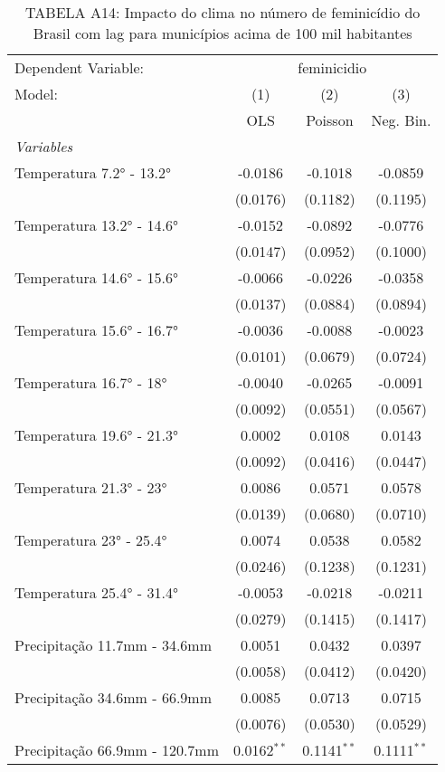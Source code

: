 \documentclass[
]{article}
\begin{document}
\begin{table}[htbp]
\centering
\caption{TABELA A14: Impacto do clima no número de feminicídio do Brasil com lag para municípios acima de 100 mil habitantes}
\begin{tabular}{lccc}
\tabularnewline\midrule\midrule
Dependent Variable:&\multicolumn{3}{c}{feminicidio}\\
Model:&(1) & (2) & (3)\\
 &  OLS & Poisson & Neg. Bin.\\
\midrule \emph{Variables}&   &   &  \\
Temperatura 7.2° - 13.2° & -0.0186 & -0.1018 & -0.0859\\
  &(0.0176) & (0.1182) & (0.1195)\\
Temperatura 13.2° - 14.6° & -0.0152 & -0.0892 & -0.0776\\
  &(0.0147) & (0.0952) & (0.1000)\\
Temperatura 14.6° - 15.6° & -0.0066 & -0.0226 & -0.0358\\
  &(0.0137) & (0.0884) & (0.0894)\\
Temperatura 15.6° - 16.7° & -0.0036 & -0.0088 & -0.0023\\
  &(0.0101) & (0.0679) & (0.0724)\\
Temperatura 16.7° - 18° & -0.0040 & -0.0265 & -0.0091\\
  &(0.0092) & (0.0551) & (0.0567)\\
Temperatura 19.6° - 21.3° & 0.0002 & 0.0108 & 0.0143\\
  &(0.0092) & (0.0416) & (0.0447)\\
Temperatura 21.3° - 23° & 0.0086 & 0.0571 & 0.0578\\
  &(0.0139) & (0.0680) & (0.0710)\\
Temperatura 23° - 25.4° & 0.0074 & 0.0538 & 0.0582\\
  &(0.0246) & (0.1238) & (0.1231)\\
Temperatura 25.4° - 31.4° & -0.0053 & -0.0218 & -0.0211\\
  &(0.0279) & (0.1415) & (0.1417)\\
Precipitação 11.7mm - 34.6mm & 0.0051 & 0.0432 & 0.0397\\
  &(0.0058) & (0.0412) & (0.0420)\\
Precipitação 34.6mm - 66.9mm & 0.0085 & 0.0713 & 0.0715\\
  &(0.0076) & (0.0530) & (0.0529)\\
Precipitação 66.9mm - 120.7mm & 0.0162$^{**}$ & 0.1141$^{**}$ & 0.1111$^{**}$\\

\end{tabular}
\end{table}
\end{document}
